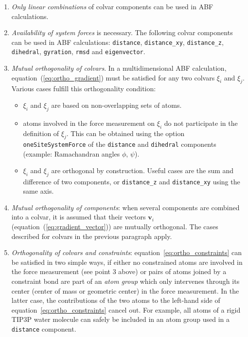 \begin{enumerate}
 \item \emph{Only linear combinations} of colvar components can be used in ABF calculations.
 \item \emph{Availability of system forces} is necessary. The following colvar components
can be used in ABF calculations:
\texttt{distance}, \texttt{distance\_xy}, \texttt{distance\_z}, \texttt{dihedral},
\texttt{gyration},  \texttt{rmsd} and \texttt{eigenvector}.
 \item \emph{Mutual orthogonality of colvars}. In a multidimensional ABF calculation,
equation~(\ref{eq:ortho_gradient}) must be satisfied for any two colvars $\xi_{i}$ and $\xi_{j}$.
Various cases fulfill this orthogonality condition:
\begin{itemize}
 \item $\xi_{i}$ and $\xi_{j}$ are based on non-overlapping sets of atoms.
 \item atoms involved in the force measurement on $\xi_{i}$ do not participate in
the definition of $\xi_{j}$. This can be obtained using the option \texttt{oneSiteSystemForce}
of the \texttt{distance} and \texttt{dihedral} components (example: Ramachandran angles $\phi$, $\psi$).
 \item $\xi_{i}$ and $\xi_{j}$ are orthogonal by construction. Useful cases are the sum and
difference of two components, or \texttt{distance\_z} and \texttt{distance\_xy} using the same axis.
\end{itemize}
 \item \emph{Mutual orthogonality of components}: when several components are combined into a colvar,
it is assumed that their vectors $\bm{v}_{i}$ (equation~(\ref{eq:gradient_vector}))
are mutually orthogonal. The cases described for colvars in the previous paragraph apply.
 \item \emph{Orthogonality of colvars and constraints}: equation~\ref{eq:ortho_constraints} can
be satisfied in two simple ways, if either no constrained atoms are involved in the force measurement
(see point 3 above) or pairs of atoms joined by a constraint bond are part of an \textit{atom group}
which only intervenes through its center (center of mass or geometric center) in the force measurement.
In the latter case, the contributions of the two atoms to the left-hand side of equation~\ref{eq:ortho_constraints}
cancel out. For example, all atoms of a rigid TIP3P water molecule can safely be included in an atom
group used in a \texttt{distance} component.
\end{enumerate}


